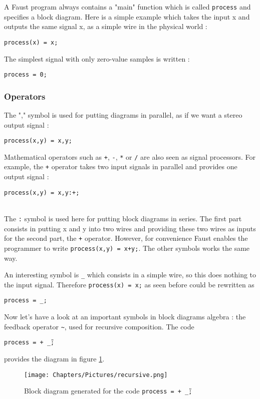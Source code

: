 A Faust program always contains a "main" function which is called \texttt{process} and specifies a block diagram. Here is a simple example which takes the input x and outputs the same signal x, as a simple wire in the physical world :\\
\centerline{\texttt{process(x) = x;}}

The simplest signal with only zero-value samples is written :\\
\centerline{\texttt{process = 0;}}

\subsubsection*{Operators}

The "," symbol is used for putting diagrams in parallel, as if we want a stereo output signal :\\
\centerline{\texttt{process(x,y) = x,y;}}

Mathematical operators such as \texttt{+}, \texttt{-}, \texttt{*} or \texttt{/} are also seen as signal processors. For example, the \texttt{+} operator takes two input signals in parallel and provides one output signal :\\
\centerline{\texttt{process(x,y) = x,y:+;}}\\
The \texttt{:} symbol is used here for putting block diagrams in series. The first part consists in putting x and y into two wires and providing these two wires as inputs for the second part, the \texttt{+} operator. However, for convenience Faust enables the programmer to write \texttt{process(x,y) = x+y;}. The other symbols works the same way.

An interesting symbol is \texttt{\_} which consists in a simple wire, so this does nothing to the input signal. Therefore \texttt{process(x) = x;} as seen before could be rewritten as \centerline{\texttt{process = \_;}}

Now let's have a look at an important symbols in block diagrams algebra : the feedback operator \texttt{\~}, used for recursive composition. The code \\
\centerline{\texttt{process = + \~  \_;}} provides the diagram in figure \ref{fig:recursive}.

\begin{figure}[h]
    \centering
    \texttt{[image: Chapters/Pictures/recursive.png]}
    \caption{Block diagram generated for the code \texttt{process = + \~  \_;}}
    \label{fig:recursive}
\end{figure}

